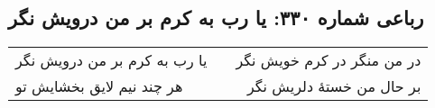 \begin{center}
\section*{رباعی شماره ۳۳۰: یا رب به کرم بر من درویش نگر}
\label{sec:sh330}
\begin{longtable}{l p{0.5cm} r}
یا رب به کرم بر من درویش نگر
&&
در من منگر در کرم خویش نگر
\\
هر چند نیم لایق بخشایش تو
&&
بر حال من خستهٔ دلریش نگر
\\
\end{longtable}
\end{center}
